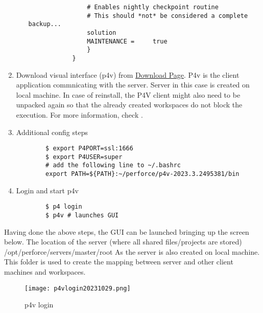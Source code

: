 \begin{enumerate}
\begin{itemize}
\begin{verbatim}
                # Enables nightly checkpoint routine
                # This should *not* be considered a complete backup...
                solution
                MAINTENANCE =     true
                }
            }
        \end{verbatim}
    \end{itemize}
    \item Download visual interface (p4v) from 
    \href{https://www.perforce.com/downloads/helix-visual-client-p4v}{\color{blue} Download Page}.
    P4v is the client application commnicating with the server. Server in this case is created on local machine. In case of
    reinstall, the P4V client might also need to be unpacked again so that the already created workspaces do not block
    the execution. For more information, check \cite{p4v}.
    \item Additional config steps
    \begin{verbatim}
        $ export P4PORT=ssl:1666
        $ export P4USER=super
        # add the following line to ~/.bashrc
        export PATH=${PATH}:~/perforce/p4v-2023.3.2495381/bin
    \end{verbatim}
    \item Login and start p4v
    \begin{verbatim}
        $ p4 login
        $ p4v # launches GUI
    \end{verbatim}
\end{enumerate}
Having done the above steps, the GUI can be launched bringing up the screen below. The location of the server (where
all shared files/projects are stored) \colorbox{blue!30}{/opt/perforce/servers/master/root} 
As the server is also created on local machine. This folder is used to create the mapping between server and other 
client machines and workspaces.
\begin{figure}[H]
    \centering
    \texttt{[image: p4vlogin20231029.png]}
      \caption{p4v login}
      \label{fig:p4v login}
\end{figure}

